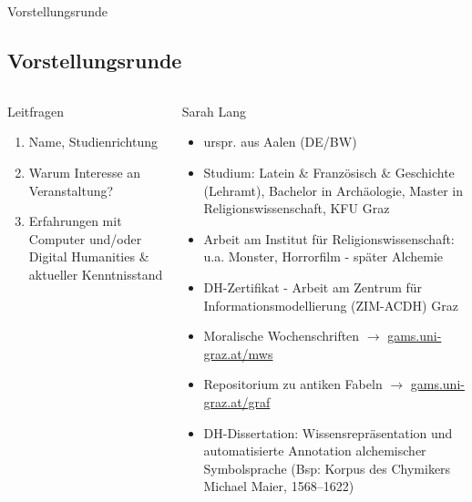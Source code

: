 \documentclass[10pt]{beamer}
\begin{document}
\begin{frame}{Vorstellungsrunde}
\subsection{Vorstellungsrunde}
  \begin{columns}[T,onlytextwidth]
      \begin{alertblock}{Leitfragen}
      \footnotesize
        \begin{enumerate}
            \item Name, Studienrichtung 
            \item Warum Interesse an Veranstaltung?
            \item Erfahrungen mit Computer und/oder Digital Humanities \& aktueller Kenntnisstand
        \end{enumerate}
      \end{alertblock}

      \begin{block}{Sarah Lang}
      \scriptsize
      \begin{itemize}
          \item urspr. aus Aalen (DE/BW)
          \item Studium: Latein \& Französisch \& Geschichte (Lehramt), Bachelor in Archäologie, Master in Religionswissenschaft, KFU Graz
          \item Arbeit am Institut für Religionswissenschaft: u.a. Monster, Horrorfilm - später Alchemie
          \item DH-Zertifikat - Arbeit am Zentrum für Informationsmodellierung (ZIM-ACDH) Graz
          \item Moralische Wochenschriften $\to$ \protect\url{gams.uni-graz.at/mws}
          \item Repositorium zu antiken Fabeln $\to$ \protect\url{gams.uni-graz.at/graf}
          \item DH-Dissertation: Wissensrepräsentation und automatisierte Annotation alchemischer Symbolsprache (Bsp: Korpus des Chymikers Michael Maier, 1568--1622)
      \end{itemize}
      \end{block}
  \end{columns}
\end{frame}



%








 
\end{document}
